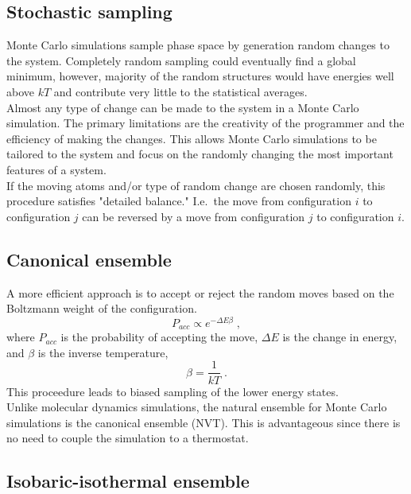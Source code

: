 \documentclass[12pt]{report}
\begin{document}
\subsection{Stochastic sampling}

Monte Carlo simulations sample phase space by generation random changes to
the system.
Completely random sampling could eventually find a global minimum, however,
majority of the random structures would have energies well above $kT$ and
contribute very little to the statistical averages. \\

Almost any type of change can be made to the system in a Monte Carlo
simulation.
The primary limitations are the creativity of the programmer and the
efficiency of making the changes.
This allows Monte Carlo simulations to be tailored to the system and focus on
the randomly changing the most important features of a system. \\

If the moving atoms and/or type of random change are chosen randomly, this
procedure satisfies "detailed balance."
I.e.\ the move from configuration $i$ to configuration $j$ can be reversed by
a move from configuration $j$ to configuration $i$.

\subsection{Canonical ensemble}

A more efficient approach is to accept or reject the random moves based on
the Boltzmann weight of the configuration.
\begin{equation}
 P_{acc} \propto e^{-\Delta E\beta} \; ,
\end{equation}
where $P_{acc}$ is the probability of accepting the move, $\Delta E$ is the
change in energy, and $\beta$ is the inverse temperature,
\begin{equation}
 \beta = \frac{1}{kT} \; .
\end{equation}
This proceedure leads to biased sampling of the lower energy states. \\

Unlike molecular dynamics simulations, the natural ensemble for Monte Carlo
simulations is the canonical ensemble (NVT).
This is advantageous since there is no need to couple the simulation to a
thermostat.

\subsection{Isobaric-isothermal ensemble}
\end{document}
